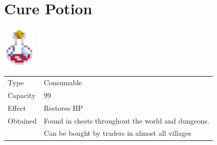 \section{Cure Potion}
\label{item:cure_potion}

\includegraphics[height=2cm,keepaspectratio]{./resources/items/curepotion}

\begin{longtable}{ l p{9cm} }
	Type
	& Consumable
\\ %
	Capacity
	& 99
\\ %
	Effect
	& Restores HP
\\ %
	Obtained
	& Found in chests throughout the world and dungeons. \\
	& Can be bought by traders in almost all villages
\end{longtable}
